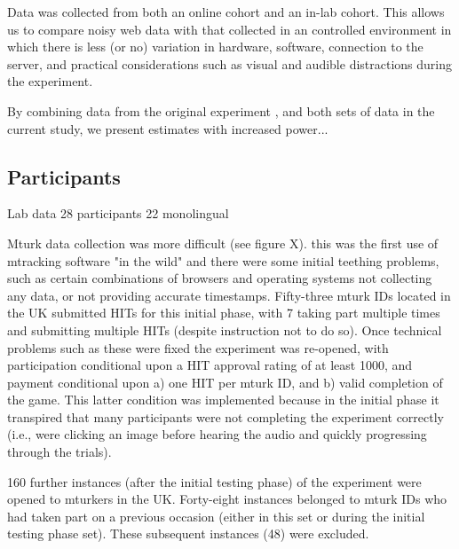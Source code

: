 \documentclass[a4paper,man,natbib]{apa6}
\begin{document}
Data was collected from both an online cohort and an in-lab cohort. 
This allows us to compare noisy web data with that collected in an controlled environment in which there is less (or no) variation in hardware, software, connection to the server, and practical considerations such as visual and audible distractions during the experiment.

By combining data from the original experiment \cite{Loy2017}, and both sets of data in the current study, we present estimates with increased power... 


\subsection*{Participants}

Lab data
28 participants
22 monolingual

Mturk data collection was more difficult (see figure X).%
this was the first use of mtracking software "in the wild" and there were some initial teething problems, such as certain combinations of browsers and operating systems not collecting any data, or not providing accurate timestamps. 
Fifty-three mturk IDs located in the UK submitted HITs for this initial phase, with 7 taking part multiple times and submitting multiple HITs (despite instruction not to do so).
Once technical problems such as these were fixed the experiment was re-opened, with participation conditional upon a HIT approval rating of at least 1000, and payment conditional upon a) one HIT per mturk ID, and b) valid completion of the game. 
This latter condition was implemented because in the initial phase it transpired that many participants were not completing the experiment correctly (i.e., were clicking an image before hearing the audio and quickly progressing through the trials). 

160 further instances (after the initial testing phase) of the experiment were opened to mturkers in the UK. 
Forty-eight instances belonged to mturk IDs who had taken part on a previous occasion (either in this set or during the initial testing phase set).
These subsequent instances (48) were excluded.
\end{document}
